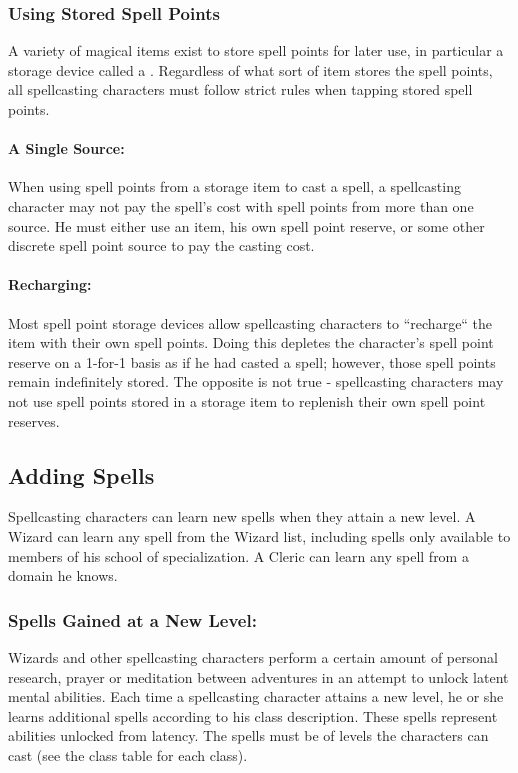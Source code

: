 \subsubsection{Using Stored Spell Points}
\label{sec:UsingStoredSpellPoints}
A variety of magical items exist to store spell points for later use, 
in particular a storage device called a . 
Regardless of what sort of item stores the spell points, all spellcasting characters must follow strict rules when tapping stored spell points.

\paragraph{A Single Source:} When using spell points from a storage item to cast a spell, 
a spellcasting character may not pay the spell's cost with spell points from more than one source. 
He must either use an item, his own spell point reserve, or some other discrete spell point source to pay the casting cost. 

\paragraph{Recharging:} Most spell point storage devices allow spellcasting characters to ``recharge`` the item with their own spell points. 
Doing this depletes the character's spell point reserve on a 1-for-1 basis as if he had casted a spell; 
however, those spell points remain indefinitely stored. 
The opposite is not true - spellcasting characters may not use spell points stored in a storage item to replenish their own spell point reserves.
\subsection{Adding Spells}
Spellcasting characters can learn new spells when they attain a new level. A Wizard can learn any spell from the Wizard list,
including spells only available to members of his school of specialization. A Cleric can learn any spell from a domain he knows. 

\subsubsection{Spells Gained at a New Level:} Wizards and other spellcasting characters perform a certain amount of personal research, 
prayer or meditation between adventures in an attempt to unlock latent mental abilities. 
Each time a spellcasting character attains a new level, he or she learns additional spells according to his class description. 
These spells represent abilities unlocked from latency. The spells must be of levels the characters can cast (see the class table for each class).


